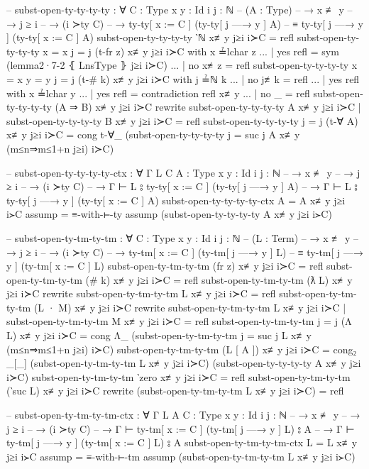 \documentclass[logo,bsc,singlespacing,parskip,online]{infthesis}
\begin{document}
\begin{code}
  -- subst-open-ty-ty-ty-ty : ∀ {C : Type} {x y : Id} {i j : ℕ}
  --   (A : Type)
  --   → x ≢ y
  --   → j ≥ i
  --   → (i ≻ty C)
  --   → ty-ty[ x := C ] (ty-ty[ j —→ y ] A)
  --     ≡ ty-ty[ j —→ y ] (ty-ty[ x := C ] A)
  subst-open-ty-ty-ty-ty ‵ℕ x≢y j≥i i≻C = refl
  subst-open-ty-ty-ty-ty {x = x} {j = j} (t-fr z) x≢y j≥i i≻C with x ≟lchar z
  ... | yes refl = sym (lemma2·7-2 ⦃ LnsType ⦄ j≥i i≻C)
  ... | no  x≢z  = refl
  subst-open-ty-ty-ty-ty {x = x} {y = y} {j = j} (t-# k) x≢y j≥i i≻C with j ≟ℕ k
  ... | no  j≢k  = refl
  ... | yes refl with x ≟lchar y
  ...   | yes refl = contradiction refl x≢y
  ...   | no  _    = refl
  subst-open-ty-ty-ty-ty (A ⇒ B) x≢y j≥i i≻C rewrite
      subst-open-ty-ty-ty-ty A x≢y j≥i i≻C
    | subst-open-ty-ty-ty-ty B x≢y j≥i i≻C
    = refl
  subst-open-ty-ty-ty-ty {j = j} (t-∀ A) x≢y j≥i i≻C = cong t-∀_
    (subst-open-ty-ty-ty-ty {j = suc j} A x≢y (m≤n⇒m≤1+n j≥i) i≻C)

  -- subst-open-ty-ty-ty-ty-ctx : ∀ {Γ L} {C A : Type} {x y : Id} {i j : ℕ}
  --   → x ≢ y
  --   → j ≥ i
  --   → (i ≻ty C)
  --   → Γ ⊢ L ⦂ ty-ty[ x := C ] (ty-ty[ j —→ y ] A)
  --   → Γ ⊢ L ⦂ ty-ty[ j —→ y ] (ty-ty[ x := C ] A)
  subst-open-ty-ty-ty-ty-ctx {A = A} x≢y j≥i i≻C assump = ≡-with-⊢-ty assump (subst-open-ty-ty-ty-ty A x≢y j≥i i≻C)

  -- subst-open-ty-tm-ty-tm : ∀ {C : Type} {x y : Id} {i j : ℕ}
  --   (L : Term)
  --   → x ≢ y
  --   → j ≥ i
  --   → (i ≻ty C)
  --   → ty-tm[ x := C ] (ty-tm[ j —→ y ] L)
  --     ≡ ty-tm[ j —→ y ] (ty-tm[ x := C ] L)
  subst-open-ty-tm-ty-tm (fr z) x≢y j≥i i≻C = refl
  subst-open-ty-tm-ty-tm (# k) x≢y j≥i i≻C = refl
  subst-open-ty-tm-ty-tm (ƛ L) x≢y j≥i i≻C rewrite
    subst-open-ty-tm-ty-tm L x≢y j≥i i≻C = refl
  subst-open-ty-tm-ty-tm (L · M) x≢y j≥i i≻C rewrite
      subst-open-ty-tm-ty-tm L x≢y j≥i i≻C
    | subst-open-ty-tm-ty-tm M x≢y j≥i i≻C
    = refl
  subst-open-ty-tm-ty-tm {j = j} (Λ L) x≢y j≥i i≻C = cong Λ_
    (subst-open-ty-tm-ty-tm {j = suc j} L x≢y (m≤n⇒m≤1+n j≥i) i≻C)
  subst-open-ty-tm-ty-tm (L [ A ]) x≢y j≥i i≻C = cong₂ _[_]
    (subst-open-ty-tm-ty-tm L x≢y j≥i i≻C)
    (subst-open-ty-ty-ty-ty A x≢y j≥i i≻C)
  subst-open-ty-tm-ty-tm ‵zero x≢y j≥i i≻C = refl
  subst-open-ty-tm-ty-tm (‵suc L) x≢y j≥i i≻C rewrite
    (subst-open-ty-tm-ty-tm L x≢y j≥i i≻C) = refl

  -- subst-open-ty-tm-ty-tm-ctx : ∀ {Γ L A} {C : Type} {x y : Id} {i j : ℕ}
  --   → x ≢ y
  --   → j ≥ i
  --   → (i ≻ty C)
  --   → Γ ⊢ ty-tm[ x := C ] (ty-tm[ j —→ y ] L) ⦂ A
  --   → Γ ⊢ ty-tm[ j —→ y ] (ty-tm[ x := C ] L) ⦂ A
  subst-open-ty-tm-ty-tm-ctx {L = L} x≢y j≥i i≻C assump = ≡-with-⊢-tm assump (subst-open-ty-tm-ty-tm L x≢y j≥i i≻C)
\end{code}
\end{document}
